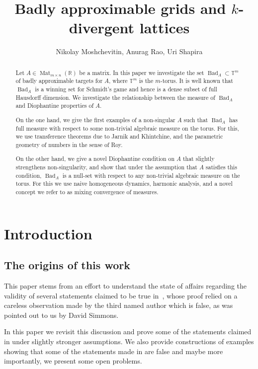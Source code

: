 \documentclass[reqno,11pt, twoside]{amsart}
\title[grids and divergence]{Badly approximable grids and $k$-divergent lattices}
\author{Nikolay Moshchevitin, Anurag Rao, Uri Shapira}
\theoremstyle{plain}
\theoremstyle{definition}
\theoremstyle{definition}
\theoremstyle{remark}
\numberwithin{equation}{section}
\newcommand{\bR}{\mathbb{R}}
\newcommand{\bT}{\mathbb{T}}
\newcommand\on[1]{\operatorname{#1}}
\begin{document}
\begin{abstract}
    
    Let $A\in\on{Mat}_{m\times n}(\bR)$ be a matrix. In this paper we investigate the set 
    $\on{Bad}_A\subset \bT^m$ of badly approximable targets for $A$, where $\bT^m$ is the $m$-torus. It is well known that $\on{Bad}_A$ is a winning set for Schmidt's game and hence is a dense subset of full Hausdorff dimension. We investigate the relationship between the measure of $\on{Bad}_A$ and Diophantine properties of $A$.
    
    On the one hand, 
    we give the first examples of a non-singular $A$ such that $\on{Bad}_A$ has full measure with respect to some non-trivial algebraic measure on the torus. For this, we use 
transference theorems due to Jarnik and Khintchine,
and the parametric geometry of numbers in the sense of Roy.
    
    On the other hand, we give a novel Diophantine condition on $A$ that slightly strengthens non-singularity, and show that under the assumption that $A$
    satisfies this condition, $\on{Bad}_A$ is a null-set with respect to any non-trivial algebraic measure on the torus. For this we use naive homogeneous dynamics, harmonic analysis, and a novel concept we refer to as
    mixing convergence of measures.
    

\end{abstract}

\maketitle

\section{Introduction}


\subsection{The origins of this work}\label{sec: origins}
This paper stems from an effort to understand the state of affairs regarding the validity of several statements claimed to be true in~\cite[\S 2.2, \S 3.2]{GDV}, whose proof relied on a careless observation made by the third named author which is false, as was pointed out to us by David Simmons.

In this paper we revisit this discussion and prove some of the statements claimed in \cite{GDV} under slightly stronger assumptions. We also provide constructions of examples showing that some of the statements made in \cite{GDV} are false and maybe more importantly, we present some open problems.
\end{document}
